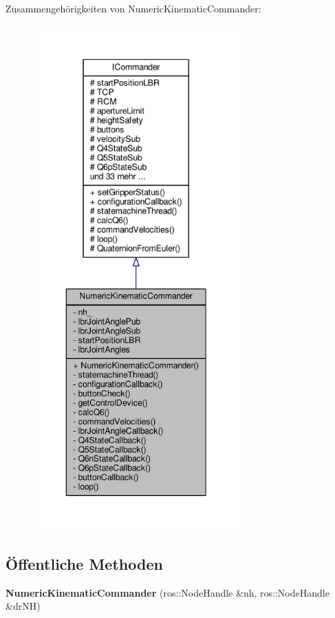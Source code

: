 Zusammengehörigkeiten von Numeric\-Kinematic\-Commander\-:
\nopagebreak
\begin{figure}[H]
\begin{center}
\leavevmode
\includegraphics[height=550pt]{classNumericKinematicCommander__coll__graph}
\end{center}
\end{figure}
\subsection*{Öffentliche Methoden}
\begin{DoxyCompactItemize}
\item 
\hypertarget{classNumericKinematicCommander_ac9e6757a3e57c18e26076aa43e73da97}{{\bfseries Numeric\-Kinematic\-Commander} (ros\-::\-Node\-Handle \&nh, ros\-::\-Node\-Handle \&dr\-N\-H)}\label{classNumericKinematicCommander_ac9e6757a3e57c18e26076aa43e73da97}

\end{DoxyCompactItemize}
